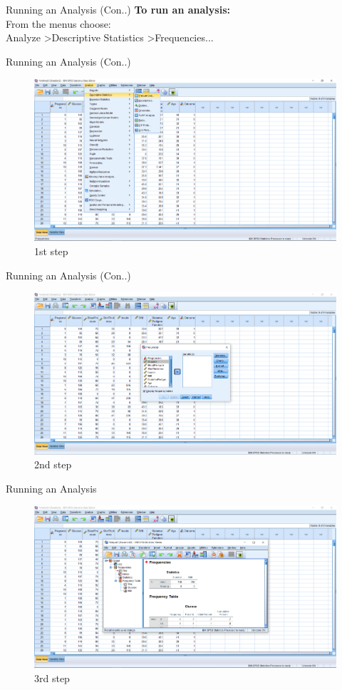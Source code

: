 \begin{frame}[t]{Running an Analysis (Con..)}
		\textbf{To run an analysis:}\\
		From the menus choose:\\
		Analyze \textgreater Descriptive Statistics \textgreater Frequencies...
\end{frame}
\begin{frame}[t]{Running an Analysis (Con..)}
		\begin{figure}
			\centering
			\includegraphics[width=12cm]{img/freq_table1}
			\caption{1st step}
		\end{figure}
\end{frame}
\begin{frame}[t]{Running an Analysis (Con..)}
		\begin{figure}
			\centering
			\includegraphics[width=12cm]{img/freq_table2}
			\caption{2nd step}
		\end{figure}	
\end{frame}
\begin{frame}[t]{Running an Analysis}
		\begin{figure}
			\centering
			\includegraphics[width=12cm]{img/freq_table3}
			\caption{3rd step}
		\end{figure}
\end{frame}
